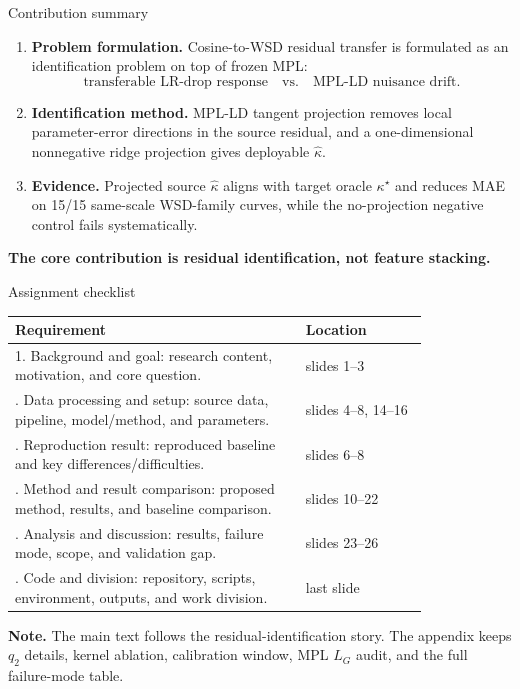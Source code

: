 \documentclass[9pt,aspectratio=169]{beamer}
\newcommand{\hl}[1]{\textcolor{blue!60!black}{\textbf{#1}}}
\begin{document}
\begin{frame}{Contribution summary}
\small
\begin{enumerate}
\item \textbf{Problem formulation.}
Cosine-to-WSD residual transfer is formulated as an identification problem on top of frozen MPL:
\[
\text{transferable LR-drop response}
\quad\text{vs.}\quad
\text{MPL-LD nuisance drift}.
\]
\item \textbf{Identification method.}
MPL-LD tangent projection removes local parameter-error directions in the source residual,
and a one-dimensional nonnegative ridge projection gives deployable \(\widehat\kappa\).
\item \textbf{Evidence.}
Projected source \(\widehat\kappa\) aligns with target oracle \(\kappa^\star\)
and reduces MAE on 15/15 same-scale WSD-family curves,
while the no-projection negative control fails systematically.
\end{enumerate}
\vfill
\begin{center}
\hl{The core contribution is residual identification, not feature stacking.}
\end{center}
\end{frame}

\begin{frame}{Assignment checklist}
\small
\begin{center}
\begin{tabular}{L{0.58\linewidth}L{0.24\linewidth}}
\toprule
Requirement & Location\\
. Background and goal: research content, motivation, and core question. &
slides 1--3\\
. Data processing and setup: source data, pipeline, model/method, and parameters. &
slides 4--8, 14--16\\
. Reproduction result: reproduced baseline and key differences/difficulties. &
slides 6--8\\
. Method and result comparison: proposed method, results, and baseline comparison. &
slides 10--22\\
. Analysis and discussion: results, failure mode, scope, and validation gap. &
slides 23--26\\
. Code and division: repository, scripts, environment, outputs, and work division. &
last slide\\
\bottomrule
\end{tabular}
\end{center}
\vfill
\textbf{Note.}
The main text follows the residual-identification story.
The appendix keeps \(q_2\) details, kernel ablation, calibration window,
MPL \(L_G\) audit, and the full failure-mode table.
\end{frame}
\end{document}
